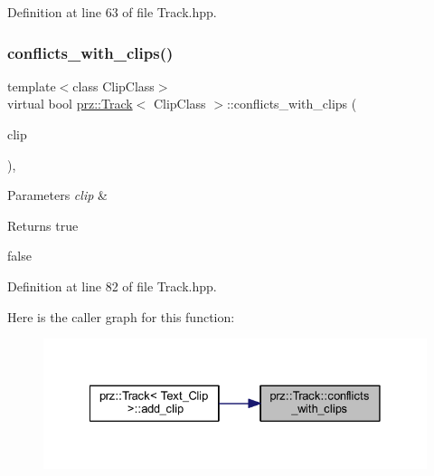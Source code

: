 Definition at line 63 of file Track.\+hpp.

\mbox{\label{classprz_1_1_track_a2f2314165a05c4748d684fca42b2f76a}} 
\subsubsection{\texorpdfstring{conflicts\_with\_clips()}{conflicts\_with\_clips()}}
{\footnotesize\ttfamily template$<$class Clip\+Class$>$ \\
virtual bool \mbox{\hyperlink{classprz_1_1_track}{prz\+::\+Track}}$<$ Clip\+Class $>$\+::conflicts\+\_\+with\+\_\+clips (\begin{DoxyParamCaption}\item[{Clip\+Class $\ast$}]{clip }\end{DoxyParamCaption})\hspace{0.3cm}{\ttfamily [inline]}, {\ttfamily [virtual]}}


\begin{DoxyParams}{Parameters}
{\em clip} & \\
\hline
\end{DoxyParams}
\begin{DoxyReturn}{Returns}
true 

false 
\end{DoxyReturn}


Definition at line 82 of file Track.\+hpp.

Here is the caller graph for this function\+:
\nopagebreak
\begin{figure}[H]
\begin{center}
\leavevmode
\includegraphics[width=328pt]{classprz_1_1_track_a2f2314165a05c4748d684fca42b2f76a_icgraph}
\end{center}
\end{figure}
\mbox{\label{classprz_1_1_track_a54eb44634d26680f1851077e64991419}} 
